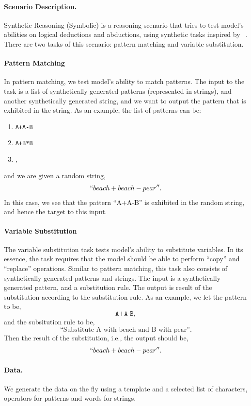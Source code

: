 \paragraph{Scenario Description.} Synthetic Reasoning (Symbolic) is a reasoning scenario that tries to test model's abilities on logical deductions and abductions, using synthetic tasks inspired by ~\citeauthor{wu2021lime}. There are two tasks of this scenario: pattern matching and variable substitution. 

\paragraph{Pattern Matching} In pattern matching, we test model's ability to match patterns. The input to the task is a list of synthetically generated patterns (represented in strings), and another synthetically generated string, and we want to output the pattern that is exhibited in the string. As an example, the list of patterns can be:
\begin{enumerate}
    \item \texttt{A+A-B}
    \item \texttt{A+B*B}
    \item {},
\end{enumerate}
and we are given a random string, 
$$
``beach + beach - pear''.
$$
In this case, we see that the pattern ``A+A-B'' is exhibited in the random string, and hence the target to this input.  

\paragraph{Variable Substitution} The variable substitution task tests model's ability to substitute variables. In its essence, the task requires that the model should be able to perform ``copy'' and ``replace'' operations. Similar to pattern matching, this task also consists of synthetically generated patterns and strings. The input is a synthetically generated pattern, and a substitution rule. The output is result of the substitution according to the substitution rule. As an example, we let the pattern to be,
$$
\texttt{A+A-B},
$$
and the subsitution rule to be,
$$
\text{``Substitute A with beach and B with pear''}.
$$
Then the result of the substitution, i.e., the output should be,
$$
``beach + beach - pear''.
$$

\paragraph{Data.} We generate the data on the fly using a template and a selected list of characters, operators for patterns and words for strings.


